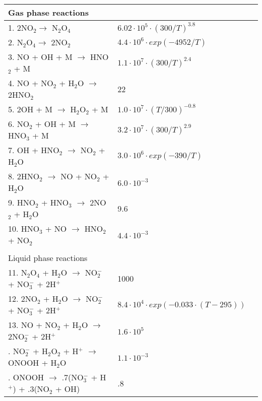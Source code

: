 \begin{ThreePartTable}
\begin{longtable}{>{\raggedright}m{3in} >{\raggedright}m{2in} >{\raggedright\arraybackslash}m{1.25in}}
            Gas phase reactions & & \\\hline
            1. 2NO$_2 \rightarrow$ N$_2$O$_4$ & $6.02\cdot10^5\cdot(300/T)^{3.8}$ & \cite{Sakiyama2012b} \\\hline
            2. N$_2$O$_4 \rightarrow$ 2NO$_2$ & $4.4\cdot10^6\cdot exp(-4952/T)$ & \cite{Sakiyama2012b} \\\hline
            3. NO + OH + M $\rightarrow$ HNO$_2$ + M & $1.1\cdot10^{7}\cdot(300/T)^{2.4}$ & \cite{Sakiyama2012b} \\\hline
            4. NO + NO$_2$ + H$_2$O $\rightarrow$ 2HNO$_2$ & 22 & \cite{wayne1951kinetics} \\\hline
            5. 2OH + M $\rightarrow$ H$_2$O$_2$ + M & $1.0\cdot10^7\cdot(T/300)^{-0.8}$ & \cite{Sakiyama2012b} \\\hline
            6. NO$_2$ + OH + M $\rightarrow$ HNO$_3$ + M & $3.2\cdot10^7\cdot(300/T)^{2.9}$ & \cite{Sakiyama2012b} \\\hline
            7. OH + HNO$_2$ $\rightarrow$ NO$_2$ + H$_2$O & $3.0\cdot10^6\cdot exp(-390/T)$ & \cite{Sakiyama2012b} \\\hline
            8. 2HNO$_2$ $\rightarrow$ NO + NO$_2$ + H$_2$O & $6.0\cdot10^{-3}$ & \cite{Sakiyama2012b} \\\hline
            9. HNO$_2$ + HNO$_3$ $\rightarrow$ 2NO$_2$ + H$_2$O & 9.6 & \cite{Sakiyama2012b} \\\hline
            10. HNO$_3$ + NO $\rightarrow$ HNO$_2$ + NO$_2$ & $4.4\cdot10^{-3}$ & \cite{dorai2002modeling} \\\hline
            \\
            Liquid phase reactions & & \\\hline
            11. N$_2$O$_4$ + H$_2$O $\rightarrow$ NO$_2^-$ + NO$_3^-$ + 2H$^+$ & 1000 & \cite{coddington1999hydroxyl} \\\hline
            12. 2NO$_2$ + H$_2$O $\rightarrow$ NO$_2^-$ + NO$_3^-$ + 2H$^+$ & $8.4\cdot10^{4}\cdot exp(-0.033\cdot(T-295))$ & \cite{park1988solubility} \\\hline
            13. NO + NO$_2$ + H$_2$O $\rightarrow$ 2NO$_2^-$ + 2H$^+$ & $1.6\cdot10^{5}$ & \cite{park1988solubility} \\\hline
            \ONOOHlong{}. NO$_2^-$ + H$_2$O$_2$ + H$^+$ $\rightarrow$ ONOOH + H$_2$O & $1.1\cdot10^{-3}$ & \cite{Lukes2014b}\\\hline
            \OHfromONOOH{}. ONOOH $\rightarrow$ .7(NO$_3^-$ + H$^+$) + .3(NO$_2$ + OH) & .8 & \cite{coddington1999hydroxyl}\\\hline

\end{longtable}
\end{ThreePartTable}
